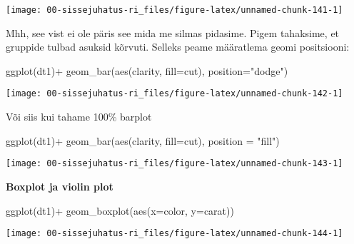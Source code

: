 \documentclass[
]{book}
\newenvironment{Shaded}{\begin{snugshade}}{\end{snugshade}}
\newcommand{\AttributeTok}[1]{\textcolor[rgb]{0.77,0.63,0.00}{#1}}
\newcommand{\FunctionTok}[1]{\textcolor[rgb]{0.00,0.00,0.00}{#1}}
\newcommand{\NormalTok}[1]{#1}
\newcommand{\SpecialCharTok}[1]{\textcolor[rgb]{0.00,0.00,0.00}{#1}}
\newcommand{\StringTok}[1]{\textcolor[rgb]{0.31,0.60,0.02}{#1}}
\begin{document}
\begin{center}\texttt{[image: 00-sissejuhatus-ri\_files/figure-latex/unnamed-chunk-141-1]} \end{center}

Mhh, see vist ei ole päris see mida me silmas pidasime. Pigem tahaksime, et gruppide tulbad asuksid kõrvuti. Selleks peame määratlema geomi positsiooni:

\begin{Shaded}
\begin{Highlighting}[]
\FunctionTok{ggplot}\NormalTok{(dt1)}\SpecialCharTok{+}
  \FunctionTok{geom\_bar}\NormalTok{(}\FunctionTok{aes}\NormalTok{(clarity, }\AttributeTok{fill=}\NormalTok{cut), }\AttributeTok{position=}\StringTok{"dodge"}\NormalTok{)}
\end{Highlighting}
\end{Shaded}

\begin{center}\texttt{[image: 00-sissejuhatus-ri\_files/figure-latex/unnamed-chunk-142-1]} \end{center}

Või siis kui tahame 100\% barplot

\begin{Shaded}
\begin{Highlighting}[]
\FunctionTok{ggplot}\NormalTok{(dt1)}\SpecialCharTok{+}
  \FunctionTok{geom\_bar}\NormalTok{(}\FunctionTok{aes}\NormalTok{(clarity, }\AttributeTok{fill=}\NormalTok{cut), }\AttributeTok{position =} \StringTok{"fill"}\NormalTok{)}
\end{Highlighting}
\end{Shaded}

\begin{center}\texttt{[image: 00-sissejuhatus-ri\_files/figure-latex/unnamed-chunk-143-1]} \end{center}

\textbf{Boxplot ja violin plot}

\begin{Shaded}
\begin{Highlighting}[]
\FunctionTok{ggplot}\NormalTok{(dt1)}\SpecialCharTok{+}
  \FunctionTok{geom\_boxplot}\NormalTok{(}\FunctionTok{aes}\NormalTok{(}\AttributeTok{x=}\NormalTok{color, }\AttributeTok{y=}\NormalTok{carat))}
\end{Highlighting}
\end{Shaded}

\begin{center}\texttt{[image: 00-sissejuhatus-ri\_files/figure-latex/unnamed-chunk-144-1]} \end{center}
\end{document}
